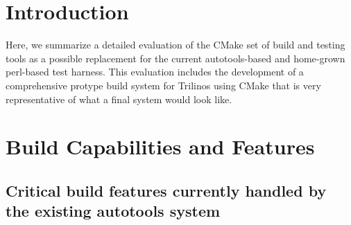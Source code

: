 \documentclass[pdf,ps2pdf,11pt]{SANDreport}
\begin{document}

%
\setcounter{secnumdepth}{3}
\SANDmain %


%
\section{Introduction}
%

Here, we summarize a detailed evaluation of the CMake set of build and
testing tools as a possible replacement for the current
autotools-based and home-grown perl-based test harness.  This
evaluation includes the development of a comprehensive protype build
system for Trilinos using CMake that is very representative of what a
final system would look like.

%
\section{Build Capabilities and Features}
%


%
{}\subsection{Critical build features currently handled by the
existing autotools system}
%
\end{document}
